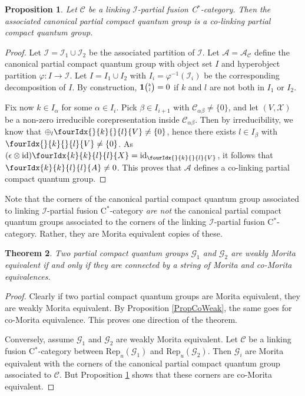 \documentclass[10pt]{article}
\DeclareMathOperator{\id}{id}
\newcommand{\CatC}{\mathcal{C}}
\newcommand{\CatCC}{\mathscr{C}}
\newcommand{\Rep}{\mathrm{Rep}}
\newcommand{\Grt}[3]{#1{\tiny {\begin{pmatrix} #2\\#3\end{pmatrix}}}}
\newcommand{\UnitC}[2]{\Grt{\mathbf{1}}{#1}{#2}}
\newcommand{\Gr}[5]{\fourIdx{#2}{#4}{#3}{#5}{#1}}%
\newcommand{\Gru}[3]{\Gr{#1}{}{}{#2}{#3}}
\newtheorem{Theorem}{Theorem}[section]
\newtheorem{Prop}[Theorem]{Proposition}
\theoremstyle{definition}
\numberwithin{equation}{section}
\begin{document}
\begin{Prop}\label{PropCoLink} Let $\CatCC$ be a linking $\mathscr{I}$-partial fusion C$^*$-category. Then the associated canonical partial compact quantum group is a co-linking partial compact quantum group. 
\end{Prop} 

\begin{proof} Let $\mathscr{I}= \mathscr{I}_1\cup \mathscr{I}_2$ be the associated partition of $\mathscr{I}$. Let $\mathscr{A} = \mathscr{A}_{\CatCC}$ define the canonical partial compact quantum group with object set $I$ and hyperobject partition $\varphi:I\rightarrow \mathscr{I}$. Let $I=I_1\cup I_2$ with $I_i = \varphi^{-1}(\mathscr{I}_i)$ be the corresponding decomposition of $I$. By construction, $\UnitC{k}{l}=0$ if $k$ and $l$ are not both in $I_1$ or $I_2$. 

Fix now $k\in I_{\alpha}$ for some $\alpha \in I_i$. Pick $\beta\in I_{i+1}$ with $\CatC_{\alpha\beta}\neq\{0\}$, and let $(V,\mathscr{X})$ be a non-zero irreducible corepresentation inside $\CatC_{\alpha\beta}$. Then by irreducibility, we know that $\oplus_l \Gru{V}{k}{l} \neq \{0\}$, hence there exists $l\in I_{\beta}$ with $\Gru{V}{k}{l}\neq \{0\}$. As $(\epsilon\otimes \id)\Gr{X}{k}{l}{k}{l} = \id_{\Gru{V}{k}{l}}$, it follows that $\Gr{A}{k}{l}{k}{l} \neq 0$. This proves that $\mathscr{A}$ defines a co-linking partial compact quantum group.
\end{proof} 

Note that the corners of the canonical partial compact quantum group associated to linking $\mathscr{I}$-partial fusion C$^*$-category \emph{are not} the canonical partial compact quantum groups associated to the corners of the linking $\mathscr{I}$-partial fusion C$^*$-category. Rather, they are Morita equivalent copies of these.

\begin{Theorem} Two partial compact quantum groups $\mathscr{G}_1$ and $\mathscr{G}_2$ are weakly Morita equivalent if and only if they are connected by a string of Morita and co-Morita equivalences. 
\end{Theorem}

\begin{proof} Clearly if two partial compact quantum groups are Morita equivalent, they are weakly Morita equivalent. By Proposition \ref{PropCoWeak}, the same goes for co-Morita equivalence. This proves one direction of the theorem. 

Conversely, assume $\mathscr{G}_1$ and $\mathscr{G}_2$ are weakly Morita equivalent. Let $\CatCC$ be a linking fusion C$^*$-category between $\Rep_u(\mathscr{G}_1)$ and $\Rep_u(\mathscr{G}_2)$. Then $\mathscr{G}_i$ are Morita equivalent with the corners of the canonical partial compact quantum group associated to $\CatCC$. But Proposition \ref{PropCoLink} shows that these corners are co-Morita equivalent. 
\end{proof} 
\end{document}
